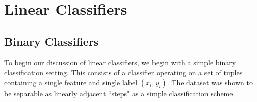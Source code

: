 \documentclass{article}
\begin{document}
\section{Linear Classifiers}
\subsection{Binary Classifiers}
To begin our discussion of linear classifiers, we begin with a simple binary classification setting. This consists of a classifier operating on a set of tuples containing a single feature and single label $(x_i, y_i)$. The dataset was shown to be separable as linearly adjacent ``steps" as a simple classification scheme.


\end{document}
